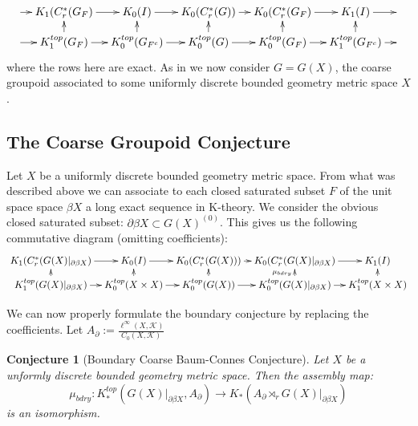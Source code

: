 \documentclass[11pt]{amsart}
\theoremstyle{plain}
\newtheorem{conj}{Conjecture}
\theoremstyle{definition}%
\theoremstyle{remark}%
\begin{document}
\begin{equation*}\label{Fig:F1}
\xymatrix@=1em{
\ar[r] & K_{1}(C^{*}_{r}(G_{F}) \ar[r] & K_{0}(I) \ar[r]& K_{0}(C^{*}_{r}(G)) \ar[r]& K_{0}(C^{*}_{r}(G_{F})\ar[r] & K_{1}(I) \ar[r] & \\
\ar[r] & K_{1}^{top}(G_{F}) \ar[r] \ar[u]& K_{0}^{top}(G_{F^{c}}) \ar[r]\ar[u]& K_{0}^{top}(G) \ar[r]\ar[u]& K_{0}^{top}(G_{F}) \ar[r]\ar[u]& K_{1}^{top}(G_{F^{c}})\ar[u] \ar[r]& 
}
\end{equation*}
where the rows here are exact. 
As in \cite{MR1911663} we now consider $G=G(X)$, the coarse groupoid associated to some uniformly discrete bounded geometry metric space $X$.

\subsection{The Coarse Groupoid Conjecture}
Let $X$ be a uniformly discrete bounded geometry metric space. From what was described above we can associate to each closed saturated subset $F$ of the unit space space $\beta X$ a long exact sequence in K-theory. We consider the obvious closed saturated subset: $\partial \beta X \subset G(X)^{(0)}$. This gives us the following commutative diagram (omitting coefficients):
\begin{equation*}
\xymatrix@=0.7em{
 K_{1}(C^{*}_{r}(G(X)|_{\partial\beta X}) \ar[r] & K_{0}(I) \ar[r]& K_{0}(C^{*}_{r}(G(X))) \ar[r]& K_{0}(C^{*}_{r}(G(X)|_{\partial\beta X})\ar[r] & K_{1}(I)  \\
 K_{1}^{top}(G(X)|_{\partial\beta X}) \ar[r] \ar[u]& K_{0}^{top}(X \times X) \ar[r]\ar[u]& K_{0}^{top}(G(X)) \ar[r]\ar[u]& K_{0}^{top}(G(X)|_{\partial\beta X}) \ar[r]\ar[u]^{\mu_{bdry}}& K_{1}^{top}(X \times X)\ar[u]
}
\end{equation*}

We can now properly formulate the boundary conjecture by replacing the coefficients. Let $A_{\partial}:= \frac{\ell^{\infty}(X,\mathcal{K})}{C_{0}(X,\mathcal{K})}$

\begin{conj} [Boundary Coarse Baum-Connes Conjecture]
Let $X$ be a unformly discrete bounded geometry metric space. Then the assembly map:
\begin{equation*}
\mu_{bdry}:K_{*}^{top}(G(X)|_{\partial\beta X}, A_{\partial}) \rightarrow K_{*}(A_{\partial}\rtimes_{r}G(X)|_{\partial\beta X})
\end{equation*}
is an isomorphism.
\end{conj}
\end{document}
